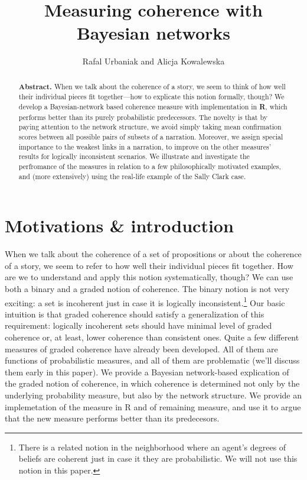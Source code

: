 \documentclass[10pt,]{scrartcl}
\title{Measuring coherence with Bayesian networks}
\author{Rafal Urbaniak and Alicja Kowalewska}
\date{\vspace{-2.5em}}
\begin{document}
\maketitle
\vspace{3mm}

\begin{abstract}  \textbf{Abstract.} When we talk about the  coherence of a story, we seem to think of how well their individual pieces fit together---how  to explicate this notion formally, though?  We  develop a Bayesian-network based coherence measure with implementation in \textbf{\textsf{R}}, which  performs better than its purely probabilistic predecessors. The novelty is that  by paying attention to  the network structure,  we avoid simply taking mean confirmation scores between all possible pairs of subsets of a narration. Moreover, we assign special importance to the weakest links in a narration, to improve on the other measures' results for logically inconsistent scenarios.  
 We illustrate  and investigate the  perfromance of the measures in relation to a few philosophically motivated examples, and (more extensively) using the real-life example of the  Sally Clark case. 
\end{abstract}






\section{Motivations \& introduction}


When we talk about the coherence of a set of propositions or about the 
coherence of a story, we seem to refer to how well their individual
pieces fit together. How are we to understand and apply this notion
systematically, though?  We can use both a binary and a graded notion of coherence. The binary notion is not very exciting: a set is incoherent
just in case it is logically
inconsistent.\footnote{There is a related notion in the neighborhood where an agent's  degrees of beliefs are coherent just in case it they are probabilistic. We will not use this notion in this paper.}  Our basic intuition is that graded coherence should satisfy  a generalization of this requirement: logically incoherent sets should have minimal level of graded coherence or, at least, lower coherence than consistent ones.   Quite a few different measures of graded coherence have already been developed. All of them are functions of probabilistic measures, and all of them are problematic (we'll discuss  them  early in this paper).  We provide a Bayesian network-based explication of the graded notion of coherence, in which    coherence is determined not only by the underlying probability measure, but also by the network structure. We provide an implemetation of the measure in \textsf{R} and of remaining measure, and use it to argue that the new measure performs better than its predecesors. 
\end{document}
